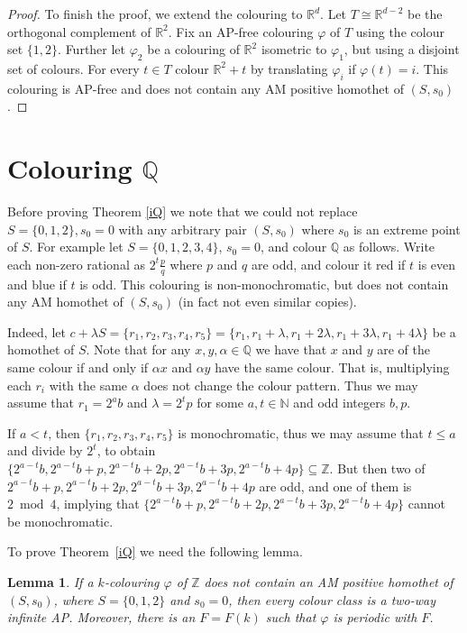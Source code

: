 \documentclass[12pt]{article}
\newcommand{\R}{{\mathbb R}}
\newcommand{\Z}{{\mathbb Z}}
\theoremstyle{plain}
\newtheorem{lemma}[theorem]{Lemma}
\theoremstyle{definition}
\begin{document}
\begin{proof}
To finish the proof, we extend the colouring to $\mathbb{R}^d$. Let $T \cong \mathbb{R}^{d-2}$ be the orthogonal complement of $\R^2$. Fix an AP-free colouring $\varphi$ of $T$ using the colour set $\{1,2\}$. Further let $\varphi_2$ be a colouring of $\mathbb{R}^2$ isometric to $\varphi_1$, but using a disjoint set of colours. For every $t\in T$ colour $\mathbb{R}^2+t$ by translating $\varphi_i$ if $\varphi(t)=i$. This colouring is AP-free and does not contain any AM positive homothet of $(S,s_0)$.
\end{proof}


\section{Colouring $\mathbb{Q}$}\label{inQ}



Before proving Theorem \ref{iQ} we note that we could not replace $S=\{0,1,2\},s_0=0$ with any arbitrary pair $(S,s_0)$ where $s_0$ is an extreme point of $S$. For example let $S=\{0,1,2,3,4\}$, $s_0=0$, and colour $\mathbb{Q}$ as follows.
Write each non-zero rational as $2^t\frac pq$ where $p$ and $q$ are odd, and colour it red if $t$ is even and blue if $t$ is odd. This colouring is non-monochromatic, but does not contain any AM homothet of $(S,s_0)$ (in fact not even similar copies).
	
Indeed, let $c+\lambda S=\{r_1,r_2,r_3,r_4,r_5\}=\{r_1,r_1+\lambda,r_1+2\lambda, r_1+3\lambda, r_1+4\lambda\}$ be a homothet of $S$. Note that for any $x,y,\alpha\in \mathbb{Q}$ we have that $x$ and $y$ are of the same colour if and only if $\alpha x$ and $\alpha y$ have the same colour. That is, multiplying each $r_i$ with the same $\alpha$ does not change the colour pattern. Thus we may assume that $r_1=2^ab$ and $\lambda=2^tp$ for some $a,t\in \mathbb{N}$ and odd integers $b,p$.
	
If $a<t$, then $\{r_1,r_2,r_3,r_4,r_5\}$ is monochromatic, thus we may assume that $t\leq a$ and divide by $2^t$, to obtain $\{2^{a-t}b,2^{a-t}b+p,2^{a-t}b+2p,2^{a-t}b+3p,2^{a-t}b+4p\}\subseteq \mathbb{Z}$. But then two of $2^{a-t}b+p,2^{a-t}b+2p,2^{a-t}b+3p,2^{a-t}b+4p$ are odd, and one of them is $2 \bmod 4$, implying that $\{2^{a-t}b+p,2^{a-t}b+2p,2^{a-t}b+3p,2^{a-t}b+4p\}$ cannot be monochromatic.

    \bigskip

To prove Theorem~\ref{iQ} we need the following lemma.

\begin{lemma}\label{lemZ}
If a $k$-colouring $\varphi$ of $\Z$ does not contain an AM positive homothet of $(S,s_0)$, where $S=\{0,1,2\}$ and $s_0=0$, then every colour class is a two-way infinite AP. Moreover, there is an $F=F(k)$ such that $\varphi$ is periodic with $F$.
\end{lemma}
\end{document}
